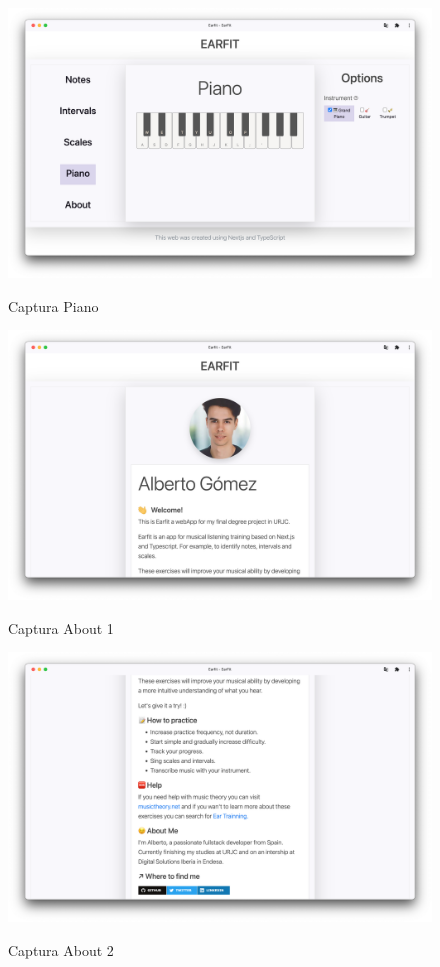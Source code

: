 \documentclass[12pt,twoside,titlepage]{report}
\begin{document}
\begin{figure}[H]
    \centering
    \includegraphics[scale=0.28]{Capturas Earfit/PC/Piano}
    \label{fig:PCPiano}
    \caption{Captura Piano}
\end{figure}

\begin{figure}[H]
    \centering
    \includegraphics[scale=0.28]{Capturas Earfit/PC/About1}
    \label{fig:PCAbout1}
    \caption{Captura About 1}
\end{figure}

\begin{figure}[H]
    \centering
    \includegraphics[scale=0.28]{Capturas Earfit/PC/About2}
    \label{fig:PCAbout2}
    \caption{Captura About 2}
\end{figure}
\end{document}
